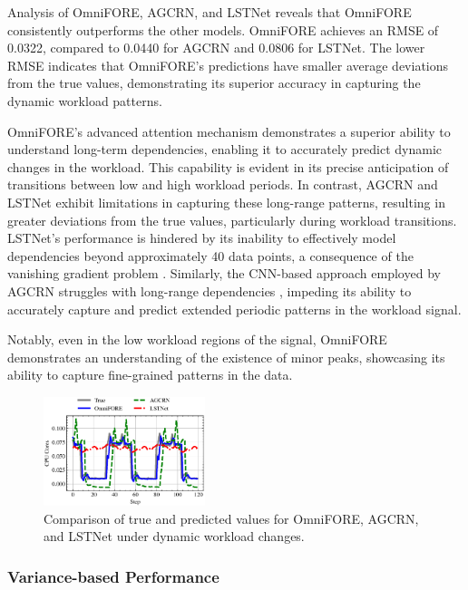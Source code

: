 \documentclass{ieeetmlcn}
\begin{document}
Analysis of OmniFORE, AGCRN, and LSTNet reveals that OmniFORE consistently outperforms the other models. OmniFORE achieves an RMSE of 0.0322, compared to 0.0440 for AGCRN and 0.0806 for LSTNet. The lower RMSE indicates that OmniFORE's predictions have smaller average deviations from the true values, demonstrating its superior accuracy in capturing the dynamic workload patterns.

OmniFORE's advanced attention mechanism demonstrates a superior ability to understand long-term dependencies, enabling it to accurately predict dynamic changes in the workload. This capability is evident in its precise anticipation of transitions between low and high workload periods. In contrast, AGCRN and LSTNet exhibit limitations in capturing these long-range patterns, resulting in greater deviations from the true values, particularly during workload transitions. LSTNet's performance is hindered by its inability to effectively model dependencies beyond approximately 40 data points, a consequence of the vanishing gradient problem \cite{zhou2021informer}. Similarly, the CNN-based approach employed by AGCRN struggles with long-range dependencies \cite{acmtimeseriesreview2024, hochreiter1998vanishing}, impeding its ability to accurately capture and predict extended periodic patterns in the workload signal.

Notably, even in the low workload regions of the signal, OmniFORE demonstrates an understanding of the existence of minor peaks, showcasing its ability to capture fine-grained patterns in the data.

\begin{figure}\centering
\centering
\includegraphics[width=0.42\textwidth]{img/dynamic_workload_changes.eps}
\caption{Comparison of true and predicted values for OmniFORE, AGCRN, and LSTNet under dynamic workload changes.}
\label{fig:dynamic_workload_changes}
\end{figure}

\subsubsection{\textbf{Variance-based Performance}}
\end{document}
